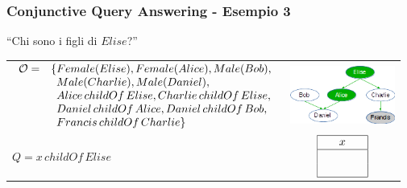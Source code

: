 \documentclass[8pt]{beamer}
\begin{document}
\begin{frame}
\frametitle{Conjunctive Query Answering - Esempio 3}
\begin{center}
``Chi sono i figli di $Elise$?''
\end{center}

\begin{tabular}{lc}
$\begin{array}{cl}
  \Ont  =  &  \{Female(Elise),  Female(Alice), Male(Bob), \\
  &\phantom{\{}Male(Charlie), Male(Daniel), \\
  &\phantom{\{}Alice\,childOf\,Elise, Charlie\,childOf\,Elise, \\
  &\phantom{\{}Daniel\,childOf\,Alice, Daniel\,childOf\,Bob, \\
  &\phantom{\{}Francis\,childOf\,Charlie \}\\
\end{array}$ & \includegraphics[width=130px]{family.png} \\
$Q=x\,childOf\,Elise$ &
$\begin{array}{|c|}
  \hline
  x\\
  \hline
  \phantom{Alice}\\
  \phantom{Charlie}\\
  \hline
\end{array}$ \\
\end{tabular}
\end{frame}
\end{document}
